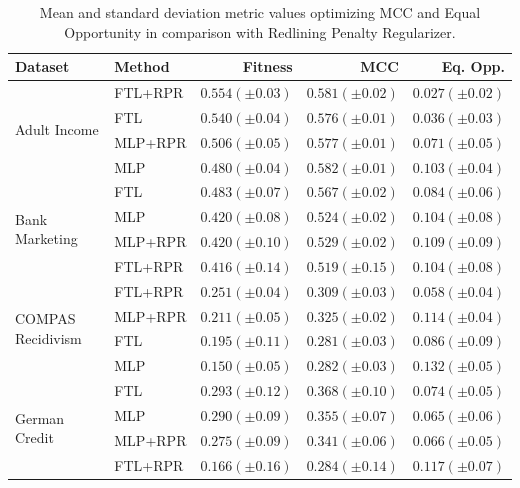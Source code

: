  \begin{table}
    \centering
    \caption{Mean and standard deviation metric values optimizing MCC and Equal Opportunity in comparison with Redlining Penalty Regularizer.}\label{tab:complete_mcc_opportunity_rpr}
    {\footnotesize\begin{tabular}{llrrr}
    \toprule
    Dataset & Method & Fitness & MCC & Eq. Opp. \\
    \midrule

    \multirow[t]{4}{*}{Adult Income} & FTL+RPR & $0.554 (\pm0.03)$ & $0.581 (\pm0.02)$ & $0.027 (\pm0.02)$ \\
     & FTL & $0.540 (\pm0.04)$ & $0.576 (\pm0.01)$ & $0.036 (\pm0.03)$ \\
     & MLP+RPR & $0.506 (\pm0.05)$ & $0.577 (\pm0.01)$ & $0.071 (\pm0.05)$ \\
     & MLP & $0.480 (\pm0.04)$ & $0.582 (\pm0.01)$ & $0.103 (\pm0.04)$ \\
    \midrule
    \multirow[t]{4}{*}{Bank Marketing} & FTL & $0.483 (\pm0.07)$ & $0.567 (\pm0.02)$ & $0.084 (\pm0.06)$ \\
     & MLP & $0.420 (\pm0.08)$ & $0.524 (\pm0.02)$ & $0.104 (\pm0.08)$ \\
     & MLP+RPR & $0.420 (\pm0.10)$ & $0.529 (\pm0.02)$ & $0.109 (\pm0.09)$ \\
     & FTL+RPR & $0.416 (\pm0.14)$ & $0.519 (\pm0.15)$ & $0.104 (\pm0.08)$ \\
    \midrule
    \multirow[t]{4}{*}{COMPAS Recidivism} & FTL+RPR & $0.251 (\pm0.04)$ & $0.309 (\pm0.03)$ & $0.058 (\pm0.04)$ \\
     & MLP+RPR & $0.211 (\pm0.05)$ & $0.325 (\pm0.02)$ & $0.114 (\pm0.04)$ \\
     & FTL & $0.195 (\pm0.11)$ & $0.281 (\pm0.03)$ & $0.086 (\pm0.09)$ \\
     & MLP & $0.150 (\pm0.05)$ & $0.282 (\pm0.03)$ & $0.132 (\pm0.05)$ \\
    \midrule
    \multirow[t]{4}{*}{German Credit} & FTL & $0.293 (\pm0.12)$ & $0.368 (\pm0.10)$ & $0.074 (\pm0.05)$ \\
     & MLP & $0.290 (\pm0.09)$ & $0.355 (\pm0.07)$ & $0.065 (\pm0.06)$ \\
     & MLP+RPR & $0.275 (\pm0.09)$ & $0.341 (\pm0.06)$ & $0.066 (\pm0.05)$ \\
     & FTL+RPR & $0.166 (\pm0.16)$ & $0.284 (\pm0.14)$ & $0.117 (\pm0.07)$ \\
     \bottomrule
\end{tabular}}
\end{table}
